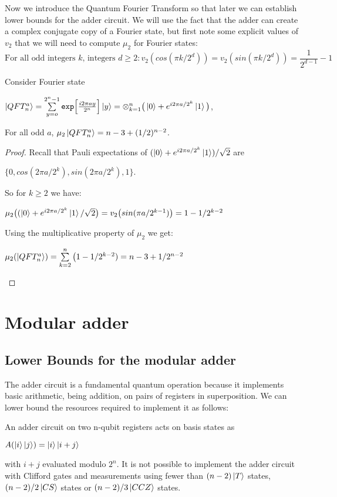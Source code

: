 \documentclass[12pt]{dalthesis}
\begin{document}
Now we introduce the Quantum Fourier Transform so that later we can establish lower bounds for the adder circuit. We will use the fact that the adder can create a complex conjugate copy of a Fourier state, but first note some explicit values of $v_2$ that we will need to compute $\mu_2$ for Fourier states:
\begin{equation}
\mbox{For all odd integers } k \mbox{, integers } d \geq 2: v_2(cos(\pi k/2^d)) = v_2(sin(\pi k /2^d)) = \frac{1}{2^{d-1}} - 1
\end{equation}

\begin{proposition}
Consider Fourier state
\begin{center}
$\ket{QFT_n^a} = \sum\limits_{y=o}^{2^n-1} \texttt{exp}\Big[ \frac{i2\pi ay}{2^n} \Big] \ket{y} = \otimes_{k=1}^n \big( \ket{0} + e^{i2\pi a/2^k}\ket{1}\big)$,
\end{center}
For all odd $a$, $\mu_2\ket{QFT_n^a} = n-3 +(1/2)^{n-2}$.
\end{proposition}
\begin{proof}
Recall that Pauli expectations of $(\ket{0} + e^{i2\pi a/2^k}\ket{1})/\sqrt{2}$ are
\begin{center}
$\{ 0, cos(2\pi a/2^k), sin(2\pi a/2^k), 1 \}$.
\end{center}
So for $k \geq 2$ we have:
\begin{center}
$\mu_2 \big( (\ket{0} + e^{i2\pi a/2^k} \ket{1}/\sqrt{2} \big) = v_2 \big( sin(\pi a/2^{k-1}) \big) = 1 - 1/2^{k-2}$
\end{center}
Using the multiplicative property of $\mu_2$ we get:
\begin{center}
$\mu_2 (\ket{QFT_n^a}) = \sum\limits_{k=2}^n \big( 1-1/2^{k-2}) = n-3 + 1/2^{n-2}$
\end{center}
\end{proof}


\section{Modular adder}
\subsection{Lower Bounds for the modular adder}
The adder circuit is a fundamental quantum operation because it implements basic arithmetic, being addition, on pairs of registers in superposition. We can lower bound the resources required to implement it as follows:

\begin{proposition}
An adder circuit on two n-qubit registers acts on basis states as 
\begin{center}
$A(\ket{i} \ket{j}) = \ket{i} \ket{i+j}$
\end{center}
with $i + j$ evaluated modulo $2^n$. It is not possible to implement the adder circuit with Clifford gates and measurements using fewer than $(n-2) \ket{T}$ states, $(n-2)/2 \ket{CS}$ states or $(n-2)/3 \ket{CCZ}$ states.
\end{proposition}
\end{document}
